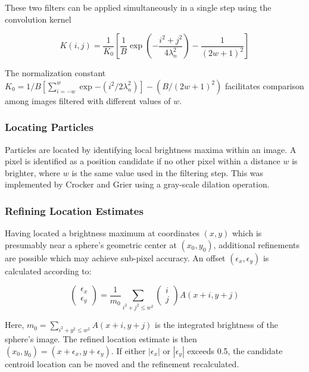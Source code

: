 These two filters can be applied simultaneously in a single step using the convolution kernel

\begin{center}\begin{equation}K(i,j) = \frac{1}{K_0} \left[ \frac{1}{B} \exp{ \left( -\frac{i^2+j^2}{4\lambda_n^2} \right)} -
\frac{1}{(2w+1)^2} \right]
\end{equation}\end{center}

The normalization constant $K_0 = 1/B[\sum_{i=-w}^w \exp{-(i^2/2\lambda_n^2)}] - (B/(2w+1)^2)$ facilitates comparison
among images filtered with different values of $w$.

\subsubsection{Locating Particles}

Particles are located by identifying local brightness maxima within an image. A pixel is identified
as a position candidate if no other pixel within a distance $w$ is brighter, where $w$ is the same value used in
the filtering step. This was implemented by Crocker and Grier using a gray-scale dilation 
operation.~\cite{soille-book}

\subsubsection{Refining Location Estimates}

Having located a brightness maximum at coordinates $(x, y)$ which is presumably near
a sphere's geometric center at $(x_0, y_0)$, additional refinements are possible
which may achieve sub-pixel accuracy.  An offset $(\epsilon_x, \epsilon_y)$ is
calculated according to:

\begin{center}
\begin{equation}
\left( \begin{array}{c} \epsilon_x \\ \epsilon_y \end{array} \right) 
= \frac{1}{m_0}
\sum_{i^2+j^2 \leq w^2} 
\left( \begin{array}{c} i \\ j \end{array} \right)
A(x+i,y+j)
\end{equation}
\end{center}

Here, $m_0 = \sum_{i^2+y^2 \leq w^2} A(x+i,y+j)$ is the integrated brightness of the
sphere's image. The refined location estimate is then $(x_0, y_0) = (x+\epsilon_x, y+\epsilon_y)$.
If either $|\epsilon_x|$ or $|\epsilon_y|$ exceeds 0.5, the candidate centroid location can be moved and the
refinement recalculated.

